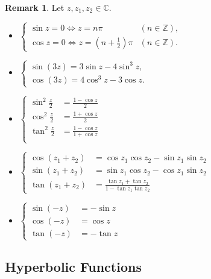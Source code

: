 \documentclass[12pt,openany]{book}
\theoremstyle{definition}
\newtheorem{remark}{Remark}[section]
\newcommand{\Z}{\mathbb{Z}}
\newcommand{\C}{\mathbb{C}}
\newcommand{\of}[1]{\left( #1 \right)}
\begin{document}
	\begin{remark}
		Let $z,z_1,z_2\in\C$. \begin{itemize}
			\item $\begin{cases}
				\sin z=0\Leftrightarrow z=n\pi& (n\in\Z),\\
				\cos z=0\Leftrightarrow z=\of{n+\frac{1}{2}}\pi& (n\in\Z).
			\end{cases}$
			\item $\begin{cases}
				\sin(3z)=3\sin z-4\sin^3z,\\
				\cos(3z)=4\cos^3z-3\cos z.
			\end{cases}$
			\item $\begin{cases}
				\sin^2\frac{z}{2}&=\displaystyle\frac{1-\cos z}{2}\\
				\cos^2\frac{z}{2}&=\displaystyle\frac{1+\cos z}{2}\\
				\tan^2\frac{z}{2}&=\displaystyle\frac{1-\cos z}{1+\cos z}\\
			\end{cases}$
			\item $\begin{cases}
				\cos(z_1+z_2)&=\cos z_1\cos z_2-\sin z_1\sin z_2\\
				\sin(z_1+z_2)&=\sin z_1\cos z_2-\cos z_1\sin z_2\\
				\tan(z_1+z_2)&=\frac{\tan z_1+\tan z_2}{1-\tan z_1\tan z_2}
			\end{cases}$
			\item $\begin{cases}
				\sin(-z)&=-\sin z\\
				\cos(-z)&=\cos z\\
				\tan(-z)&=-\tan z
			\end{cases}$
		\end{itemize}
	\end{remark}
	
	\subsection{Hyperbolic Functions}
	
\end{document}
